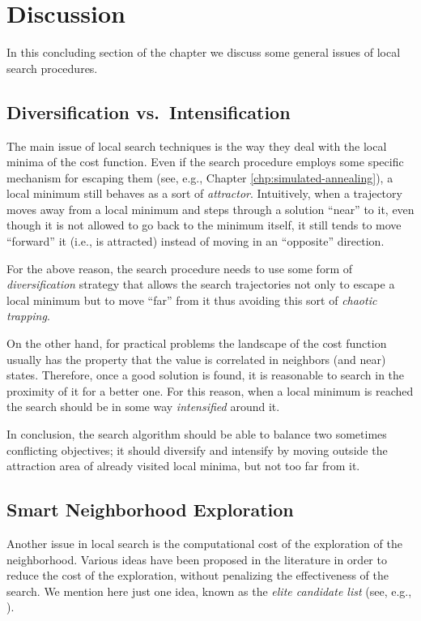 \section{Discussion}\label{sec:discussion}

In this concluding section of the chapter we discuss some general
issues of local search procedures.

\subsection{Diversification vs.\ Intensification}

The main issue of local search techniques is the way they deal
with the local minima of the cost function. Even if the search
procedure employs some specific mechanism for escaping them (see, e.g., Chapter \ref{chp:simulated-annealing}),
a local minimum still behaves as a sort of \emph{attractor}.
Intuitively, when a trajectory moves away from a local minimum and
steps through a solution ``near'' to it, even though it is not allowed
to go back to the minimum itself, it still tends to move ``forward''
it (i.e., is attracted) instead of moving in an ``opposite'' direction.

For the above reason, the search procedure needs to use some form of
\emph{diversification} strategy that allows the search trajectories
not only to escape a local minimum but to move ``far'' from it thus
avoiding this sort of \emph{chaotic trapping}. 
 
On the other hand, for practical problems the landscape of the
cost function usually has the property that the value is
correlated in neighbors (and near) states.  Therefore, once a good
solution is found, it is reasonable to search in the proximity of it
for a better one. For this reason, when a local minimum is reached the
search should be in some way \emph{intensified} around it.  

In conclusion, the search algorithm should be able to balance two
sometimes conflicting objectives; it should diversify and intensify by
moving outside the attraction area of already visited local minima,
but not too far from it.  


\subsection{Smart Neighborhood Exploration}

Another issue in local search is the computational cost of the
exploration of the neighborhood.  Various ideas have been proposed in
the literature in order to reduce the cost of the exploration, without
penalizing the effectiveness of the search. We mention here just one
idea, known as the \emph{elite candidate list} (see, e.g., \cite[Section 3.2]{GlLa97}).

